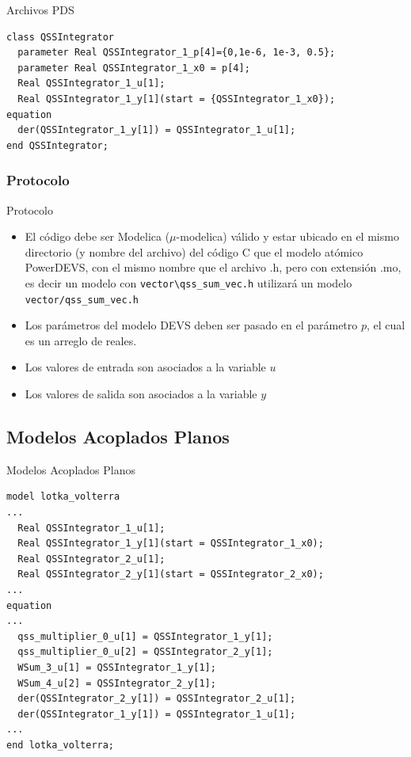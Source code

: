 \documentclass[10pt,handout]{beamer}
\begin{document}
\begin{frame}[fragile]{Archivos PDS}
\centering
\begin{verbatim}
class QSSIntegrator
  parameter Real QSSIntegrator_1_p[4]={0,1e-6, 1e-3, 0.5};
  parameter Real QSSIntegrator_1_x0 = p[4];
  Real QSSIntegrator_1_u[1];
  Real QSSIntegrator_1_y[1](start = {QSSIntegrator_1_x0});
equation
  der(QSSIntegrator_1_y[1]) = QSSIntegrator_1_u[1];
end QSSIntegrator;
\end{verbatim}
\end{frame}

		\subsubsection{Protocolo}
\begin{frame}[fragile]{Protocolo}
\begin{itemize}
        \item<1-> El código debe ser Modelica ($\mu$-modelica) válido y estar ubicado en el mismo directorio (y nombre del archivo) del código C que el modelo atómico 
        PowerDEVS, con el mismo nombre que el archivo .h, pero con extensión .mo, es decir un modelo con \texttt{vector\textbackslash qss\_sum\_vec.h} 
	utilizará un modelo \texttt{vector/qss\_sum\_vec.h} 
        \item<2-> Los parámetros del modelo DEVS deben ser pasado en el parámetro $p$, el cual es un arreglo de reales. 
        \item<3-> Los valores de entrada son asociados a la variable $u$
        \item<4-> Los valores de salida son asociados a la variable $y$
\end{itemize}
\end{frame}

	\subsection{Modelos Acoplados Planos}

\begin{frame}[fragile]{Modelos Acoplados Planos}
\begin{verbatim}
model lotka_volterra
...
  Real QSSIntegrator_1_u[1];
  Real QSSIntegrator_1_y[1](start = QSSIntegrator_1_x0);
  Real QSSIntegrator_2_u[1];
  Real QSSIntegrator_2_y[1](start = QSSIntegrator_2_x0);
...
equation
...
  qss_multiplier_0_u[1] = QSSIntegrator_1_y[1];
  qss_multiplier_0_u[2] = QSSIntegrator_2_y[1];
  WSum_3_u[1] = QSSIntegrator_1_y[1];
  WSum_4_u[2] = QSSIntegrator_2_y[1];
  der(QSSIntegrator_2_y[1]) = QSSIntegrator_2_u[1];
  der(QSSIntegrator_1_y[1]) = QSSIntegrator_1_u[1];
...
end lotka_volterra;
\end{verbatim}
\end{frame}
\end{document}
